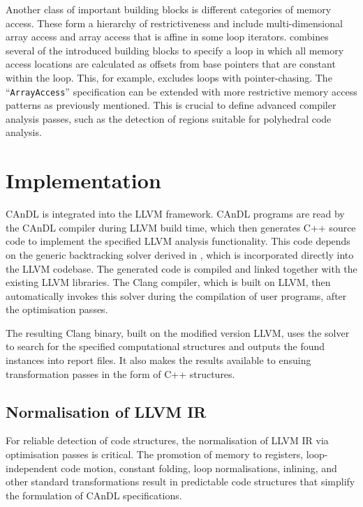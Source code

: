    Another class of important building blocks is different categories of
    memory access.
    These form a hierarchy of restrictiveness and include multi-dimensional
    array access and array access that is affine in some loop iterators.
     combines several of the introduced building blocks to
    specify a loop in which all memory access locations are calculated as
    offsets from base pointers that are constant within the loop.
    This, for example, excludes loops with pointer-chasing.
    The ``{\tt ArrayAccess}'' specification can be extended with more restrictive
    memory access patterns as previously mentioned.
    This is crucial to define advanced compiler analysis passes, such as the
    detection of regions suitable for polyhedral code analysis.

\section{Implementation}

    CAnDL is integrated into the LLVM framework.
    CAnDL programs are read by the CAnDL compiler during LLVM build time, which
    then generates C++ source code to implement the specified LLVM analysis
    functionality.
    This code depends on the generic backtracking solver derived in
    , which is incorporated directly into the LLVM
    codebase.
    The generated code is compiled and linked together with the existing LLVM
    libraries.
    The Clang compiler, which is built on LLVM, then automatically invokes this
    solver during the compilation of user programs, after the optimisation
    passes.

    The resulting Clang binary, built on the modified version LLVM, uses the
    solver to search for the specified computational structures and outputs the
    found instances into report files.
    It also makes the results available to ensuing transformation passes in the
    form of C++ structures.

\subsection{Normalisation of LLVM IR}

    For reliable detection of code structures, the normalisation of LLVM IR via
    optimisation passes is critical.
    The promotion of memory to registers, loop-independent code motion,
    constant folding, loop normalisations, inlining, and other standard
    transformations result in predictable code structures that simplify the
    formulation of CAnDL specifications.

